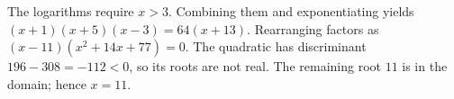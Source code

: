 The logarithms require $ x>3 $. Combining them and exponentiating yields $(x+1)(x+5)(x-3)=64(x+13)$. Rearranging factors as $(x-11)(x^2+14x+77)=0 $. The quadratic has discriminant $ 196-308=-112<0 $, so its roots are not real. The remaining root $ 11 $ is in the domain; hence $\boxed{x=11}$.
